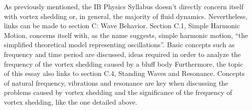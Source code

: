 As previously mentioned, the IB Physics Syllabus doesn’t directly concern itself with vortex shedding or, in general, the majority of fluid dynamics. Nevertheless, links can be made to section C: Wave Behavior. Section C.1, Simple Harmonic Motion, concerns itself with, as the name suggests, simple harmonic motion, “the simplified theoretical model representing oscillations”. Basic concepts such as frequency and time period are discussed,  ideas required in order to analyze the frequency of the vortex shedding caused by a bluff body Furthermore, the topic of this essay also links to section C.4, Standing Waves and Resonance. Concepts of natural frequency, vibrations and resonance are key when discussing the problems caused by vortex shedding and the significance of the frequency of vortex shedding, like the one detailed above. 